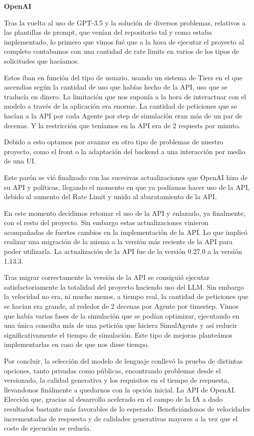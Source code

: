 \textbf{OpenAI}

Tras la vuelta al uso de GPT-3.5 y la solución de diversos problemas, relativos a las plantillas de prompt, que venían del repositorio tal y como estaba implementado, lo primero que vimos fué que a la hora de ejecutar el proyecto al completo contabamos con una cantidad de rate limits en varios de los tipos de solicitudes que hacíamos.

Estos iban en función del tipo de usuario, usando un sistema de Tiers en el que ascendias según la cantidad de uso que habías hecho de la API, uso que se traducía en dinero. La limitación que nos suponía a la hora de interactuar con el modelo a través de la aplicación era enorme. La cantidad de peticiones que se hacían a la API por cada Agente por step de simulación eran más de un par de decenas. Y la restricción que teníamos en la API era de 2 requests por minuto.

Debido a esto optamos por avanzar en otro tipo de problemas de nuestro proyecto, como el front o la adaptación del backend a una interacción por medio de una UI.

Este parón se vió finalizado con las sucesivas actualizaciones que OpenAI hizo de su API y políticas, llegando el momento en que ya podíamos hacer uso de la API, debido al aumento del Rate Limit y unido al abaratamiento de la API.

En este momento decidimos retomar el uso de la API y enlazarlo, ya finalmente, con el resto del proyecto. Sin embargo estas actualizaciones vinieron acompañadas de fuertes cambios en la implementación de la API. Lo que implicó realizar una migración de la misma a la versión más reciente de la API para poder utilizarla. La actualización de la API fue de la versión 0.27.0 a la versión 1.13.3. 

Tras migrar correctamente la versión de la API se consiguió ejecutar satisfactoriamente la totalidad del proyecto haciendo uso del LLM. Sin embargo la velocidad no era, ni mucho menos, a tiempo real, la cantidad de peticiones que se hacian era grande, al rededor de 2 decenas por Agente por timestep. Vimos que había varias fases de la simulación que se podían optimizar, ejecutando en una única consulta más de una petición que hiciera SimulAgents y así reducir significativamente el tiempo de simulación. Este tipo de mejoras planteámos implementarlas en caso de que nos diese tiempo.

Por concluir, la selección del modelo de lenguaje conllevó la prueba de distintas opciones, tanto privadas como públicas, encontrando problemas desde el versionado, la calidad generativa y los requisitos en el tiempo de respuesta, llevandonos finálmente a quedarnos con la opción inicial. La API de OpenAI. Elección que, gracias al desarrollo acelerado en el campo de la IA a dado resultados bastante más favorables de lo esperado. Beneficiándonos de velocidades incrementadas de respuesta y de calidades generativas mayores a la vez que el coste de ejecución se reducía.

